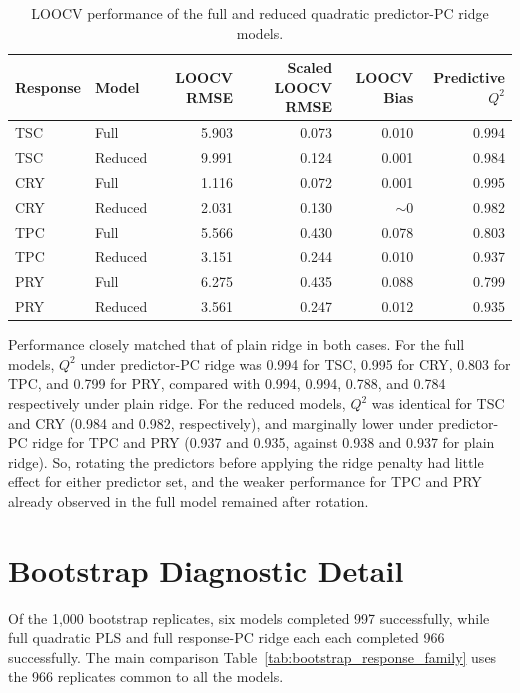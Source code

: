 \documentclass[MScDSA]{uccthesis}
\begin{document}
\begin{table}[H]
\centering
\small
\caption{LOOCV performance of the full and reduced quadratic predictor-PC ridge models.}
\label{tab:predictor_pc_ridge_loocv}
\begin{tabular}{llrrrr}
\toprule
\textbf{Response} & \textbf{Model} & \textbf{LOOCV RMSE} & \textbf{Scaled LOOCV RMSE} & \textbf{LOOCV Bias} & \textbf{Predictive $Q^2$} \\
\midrule
TSC & Full & 5.903 & 0.073 & 0.010 & 0.994 \\
TSC & Reduced & 9.991 & 0.124 & 0.001 & 0.984 \\
CRY & Full & 1.116 & 0.072 & 0.001 & 0.995 \\
CRY & Reduced & 2.031 & 0.130 & $\sim 0$ & 0.982 \\
TPC & Full & 5.566 & 0.430 & 0.078 & 0.803 \\
TPC & Reduced & 3.151 & 0.244 & 0.010 & 0.937 \\
PRY & Full & 6.275 & 0.435 & 0.088 & 0.799 \\
PRY & Reduced & 3.561 & 0.247 & 0.012 & 0.935 \\
\bottomrule
\end{tabular}
\end{table}

Performance closely matched that of plain ridge in both cases. For the full models, $Q^2$ under predictor-PC ridge was 0.994 for TSC, 0.995 for CRY, 0.803 for TPC, and 0.799 for PRY, compared with 0.994, 0.994, 0.788, and 0.784 respectively under plain ridge. For the reduced models, $Q^2$ was identical for TSC and CRY (0.984 and 0.982, respectively), and marginally lower under predictor-PC ridge for TPC and PRY (0.937 and 0.935, against 0.938 and 0.937 for plain ridge). So, rotating the predictors before applying the ridge penalty had little effect for either predictor set, and the weaker performance for TPC and PRY already observed in the full model remained after rotation.

\section{Bootstrap Diagnostic Detail}
\label{app:bootstrap_diagnostic}
Of the 1,000 bootstrap replicates, six models completed 997 successfully, while full quadratic PLS and full response-PC ridge each each completed 966 successfully. The main comparison Table~\ref{tab:bootstrap_response_family} uses the 966 replicates common to all the models.
%
%
\backmatter 
%
%
\end{document}
